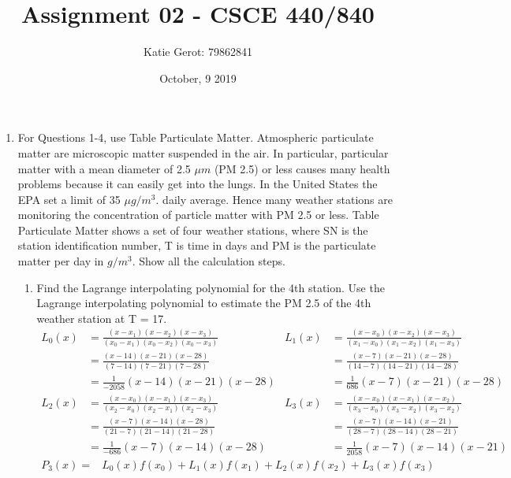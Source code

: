 \documentclass{exam}
\title{Assignment 02 - CSCE 440/840}
\author{Katie Gerot: 79862841}
\date{October, 9 2019}
\begin{document}
\maketitle

\begin{enumerate}
    \item For Questions 1-4, use Table Particulate Matter. Atmospheric particulate matter are microscopic matter suspended in the air. In particular, particular matter with a mean diameter of 2.5 $\mu m$ (PM 2.5) or less causes many health problems because it can easily get into the lungs.  In the United States the EPA set a limit of 35 $\mu g/m^3$.  daily average.  Hence many weather stations are monitoring the  concentration  of  particle  matter  with  PM  2.5  or  less. Table  Particulate Matter shows a set of four weather stations, where SN is the station identification number, T is time in days and PM is the particulate matter per day in $g/m^3$.  Show all the calculation steps.
    \begin{enumerate}
        \item Find the Lagrange interpolating polynomial for the 4th station.  Use the Lagrange interpolating polynomial to estimate the PM 2.5 of the 4th weather station at T = 17.
        \begin{align*}
            L_0(x)  &= \frac{(x-x_1)(x-x_2)(x-x_3)}{(x_0-x_1)(x_0-x_2)(x_0-x_3)}&   L_1(x)  &= \frac{(x-x_0)(x-x_2)(x-x_3)}{(x_1-x_0)(x_1-x_2)(x_1-x_3)}\\
                    &= \frac{(x-14)(x-21)(x-28)}{(7-14)(7-21)(7-28)}            &           &= \frac{(x-7)(x-21)(x-28)}{(14-7)(14-21)(14-28)}\\
                    &= \frac{1}{-2058}(x-14)(x-21)(x-28)                        &           &= \frac{1}{686}(x-7)(x-21)(x-28)\\
            L_2(x)  &= \frac{(x-x_0)(x-x_1)(x-x_3)}{(x_2-x_0)(x_2-x_1)(x_2-x_3)}&   L_3(x)  &= \frac{(x-x_0)(x-x_1)(x-x_2)}{(x_3-x_0)(x_3-x_2)(x_3-x_2)}\\
                    &= \frac{(x-7)(x-14)(x-28)}{(21-7)(21-14)(21-28)}           &           &= \frac{(x-7)(x-14)(x-21)}{(28-7)(28-14)(28-21)}\\
                    &= \frac{1}{-686}(x-7)(x-14)(x-28)                          &           &= \frac{1}{2058}(x-7)(x-14)(x-21)
        \end{align*}
        \begin{align*}
            P_3(x)  =& L_0(x)f(x_0) + L_1(x)f(x_1) + L_2(x)f(x_2) + L_3(x)f(x_3)\\

\end{align*}
\end{enumerate}
\end{enumerate}
\end{document}
